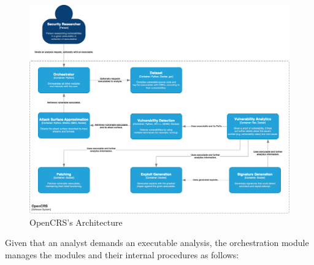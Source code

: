 \documentclass[../main.tex]{subfiles}
\begin{document}
\begin{landscape}
\renewcommand*\figurename{Figure}
\begin{figure}[!h]
   \centering
    \includegraphics[height=0.95\textheight]{images/opencrs.png}
    \caption{OpenCRS's Architecture}
    \label{fig:opencrs_architecture}
\end{figure}
\end{landscape}

Given that an analyst demands an executable analysis, the orchestration
module manages the modules and their internal procedures as follows:
\end{document}
